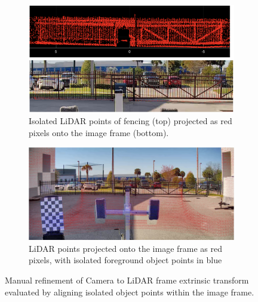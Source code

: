 \documentclass{erauthesis}
\begin{document}
\begin{figure}[htbp]
    \centering
    \begin{subfigure}{0.85\textwidth}
        \centering
        \includegraphics[width=\textwidth]{Images/LiDAR_calib_fence.png}
        \caption{Isolated LiDAR points of fencing (top) projected as red pixels onto the image frame (bottom).}
        \label{fig:LiDAR_calib_fence}
    \end{subfigure}
    
    \vspace{0.5em} %

    \begin{subfigure}{0.85\textwidth}
        \centering
        \includegraphics[width=\textwidth]{Images/LiDAR_calib_composite.png}
        \caption{LiDAR points projected onto the image frame as red pixels, with isolated foreground object points in blue}
        \label{fig:LiDAR_calib_composite}
    \end{subfigure}

    \caption{Manual refinement of Camera to LiDAR frame extrinsic transform evaluated by aligning isolated object points within the image frame.}
    \label{fig:LiDAR_calib_combined}
\end{figure}
\end{document}

